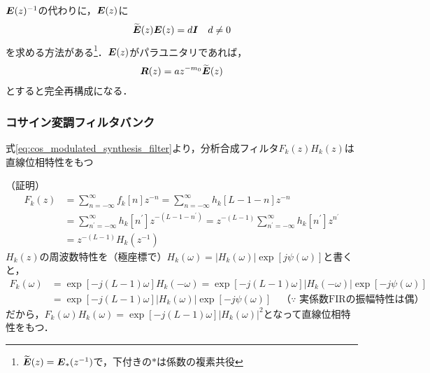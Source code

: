 \documentclass[14pt,xcolor=dvipsnames,table,dvipdfmx]{beamer}
\begin{document}
\begin{frame}[c]
    \frametitle{}
    $\boldsymbol{E}(z)^{-1}$の代わりに，$\boldsymbol{E}(z)$に
    \begin{align}
        \widetilde{\boldsymbol{E}}(z) \boldsymbol{E}(z) = d \boldsymbol{I} \quad d \neq 0
    \end{align}
    を求める方法がある\footnote{$\widetilde{\boldsymbol{E}}(z) = \boldsymbol{E}_{\ast}(z^{-1})$で，下付きの$\ast$は係数の複素共役}．$\boldsymbol{E}(z)$がパラユニタリであれば，
    \begin{align*}
        \boldsymbol{R}(z) = a z^{-m_{0}} \widetilde{\boldsymbol{E}}(z)
    \end{align*}
    とすると完全再構成になる．
\end{frame}

\begin{frame}[c]
    \frametitle{コサイン変調フィルタバンク}
    \begin{block}{}
    式\eqref{eq:cos_modulated_synthesis_filter}より，分析合成フィルタ$F_{k}(z)H_{k}(z)$は直線位相特性をもつ
    \end{block}
    \scriptsize
    （証明）
    \begin{align*}
        F_{k}(z) &= \sum_{n = -\infty}^{\infty} f_{k}[n] z^{-n} = \sum_{n = -\infty}^{\infty} h_{k}[L - 1 - n] z^{-n} \\
        &= \sum_{n^{\prime} = -\infty}^{\infty} h_{k}[n^{\prime}] z^{-(L - 1 - n^{\prime})} = z^{-(L-1)} \sum_{n^{\prime} = -\infty}^{\infty} h_{k}[n^{\prime}] z^{n^{\prime}} \\
        &= z^{-(L-1)} H_{k}(z^{-1})
    \end{align*}
    $H_{k}(z)$の周波数特性を（極座標で）$H_{k}(\omega) = |H_{k}(\omega)| \exp[j \psi(\omega)]$と書くと，
    \begin{align*}
        F_{k}(\omega) &= \exp[-j(L - 1)\omega] H_{k}(-\omega) = \exp[-j(L - 1)\omega] |H_{k}(-\omega)| \exp[-j \psi(\omega)] \\
        &= \exp[-j(L - 1)\omega] |H_{k}(\omega)| \exp[-j \psi(\omega)] \quad \text{（$\because$ 実係数FIRの振幅特性は偶）}
    \end{align*}
    だから，$F_{k}(\omega) H_{k}(\omega) = \exp[-j(L - 1)\omega] |H_{k}(\omega)|^{2}$となって直線位相特性をもつ．
\end{frame}
\end{document}
